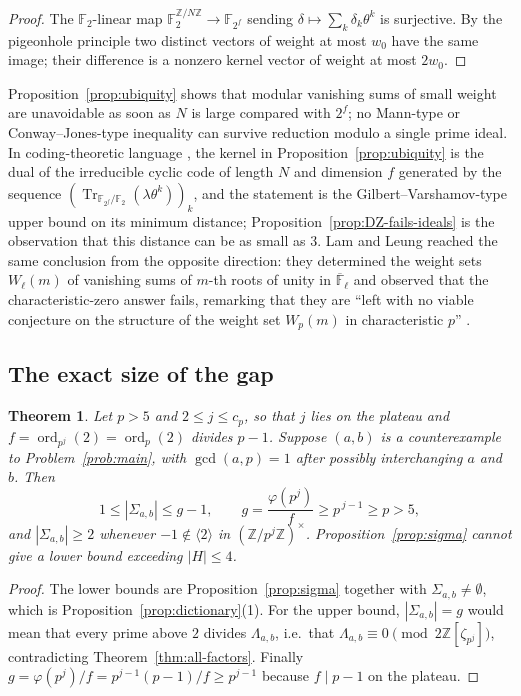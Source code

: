 \documentclass[a4paper]{article}
\newtheorem{theorem}{Theorem}[section]
\newcommand{\F}{\mathbb{F}}
\newcommand{\Z}{\mathbb{Z}}
\newcommand{\ord}[2][]{\operatorname{ord}_{#1}\!\left(#2\right)}
\newcommand{\abs}[1]{\left|#1\right|}
\DeclareMathOperator{\Tr}{Tr}
\begin{document}
\begin{proof}
	The $\F_2$-linear map $\F_2^{\Z/N\Z}\to\F_{2^{f}}$ sending
	$\delta\mapsto\sum_k\delta_k\theta^{k}$ is surjective.
	By the pigeonhole principle two distinct vectors of weight at most
	$w_0$ have the same image; their difference is a nonzero kernel vector
	of weight at most $2w_0$.
\end{proof}

Proposition~\ref{prop:ubiquity} shows that modular vanishing sums of small
weight are unavoidable as soon as $N$ is large compared with $2^{f}$; no
Mann-type or Conway--Jones-type inequality can survive reduction modulo a
single prime ideal.
In coding-theoretic language \cite[Ch.~7]{MacWilliamsSloane}, the kernel in
Proposition~\ref{prop:ubiquity} is the dual of the irreducible cyclic code
of length $N$ and dimension $f$ generated by the sequence
$\left(\Tr_{\F_{2^{f}}/\F_2}(\lambda\theta^{k})\right)_{k}$, and the
statement is the Gilbert--Varshamov-type upper bound on its minimum
distance; Proposition~\ref{prop:DZ-fails-ideals} is the observation that
this distance can be as small as $3$.
Lam and Leung reached the same conclusion from the opposite direction: they
determined the weight sets $W_\ell(m)$ of vanishing sums of $m$-th roots of
unity in $\overline{\F}_\ell$ and observed that the characteristic-zero
answer fails, remarking that they are ``left with no viable conjecture on
the structure of the weight set $W_p(m)$ in characteristic $p$''
\cite[\S1]{LamLeung1996}.

\subsection{The exact size of the gap}

\begin{theorem}\label{thm:gap}
	Let $p>5$ and $2\leq j\leq c_p$, so that $j$ lies on the plateau and
	$f=\ord[p^j]{2}=\ord[p]{2}$ divides $p-1$.
	Suppose $(a,b)$ is a counterexample to Problem~\ref{prob:main}, with
	$\gcd(a,p)=1$ after possibly interchanging $a$ and $b$.
	Then
	\[
		1\leq\abs{\Sigma_{a,b}}\leq g-1,
		\qquad
		g=\frac{\varphi(p^j)}{f}\geq p^{\,j-1}\geq p>5 ,
	\]
	and $\abs{\Sigma_{a,b}}\geq2$ whenever $-1\notin\langle2\rangle$ in
	$(\Z/p^j\Z)^{\times}$.
	Proposition~\ref{prop:sigma} cannot give a lower bound exceeding
	$\abs{H}\leq4$.
\end{theorem}

\begin{proof}
	The lower bounds are Proposition~\ref{prop:sigma} together with
	$\Sigma_{a,b}\ne\emptyset$, which is
	Proposition~\ref{prop:dictionary}(1).
	For the upper bound, $\abs{\Sigma_{a,b}}=g$ would mean that every prime
	above $2$ divides $\Lambda_{a,b}$, i.e.\ that
	$\Lambda_{a,b}\equiv0\pmod{2\Z[\zeta_{p^j}]}$, contradicting
	Theorem~\ref{thm:all-factors}.
	Finally $g=\varphi(p^j)/f=p^{j-1}(p-1)/f\geq p^{j-1}$ because
	$f\mid p-1$ on the plateau.
\end{proof}
\end{document}
